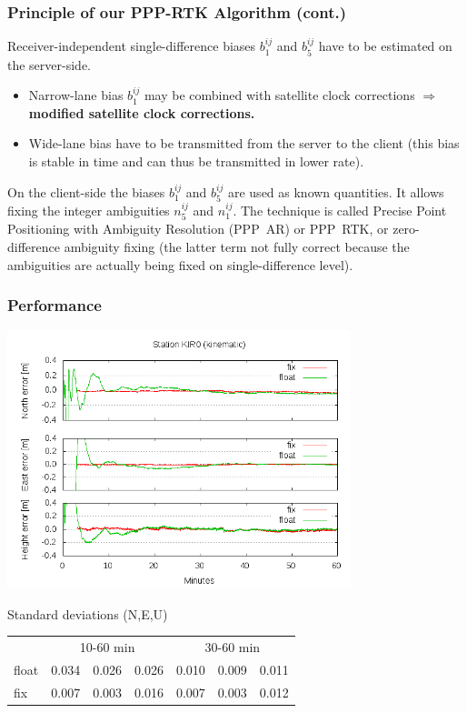 \documentclass[10pt]{beamer}
\begin{document}
\begin{frame}
  \frametitle{Principle of our PPP-RTK Algorithm (cont.)}
  Receiver-independent single-difference biases $b_1^{ij}$ and $b_5^{ij}$ have 
  to be estimated on the server-side.
  \begin{itemize}
  \item Narrow-lane bias $b_1^{ij}$ may be combined with satellite clock
    corrections $\Longrightarrow$ \textbf{modified satellite clock corrections.}
  \item Wide-lane bias have to be transmitted from the server to the client
    (this bias is stable in time and can thus be transmitted in lower rate).
  \end{itemize}

  On the client-side the biases $b_1^{ij}$ and $b_5^{ij}$ are used as known
  quantities. It allows fixing the integer ambiguities $n_5^{ij}$ and
  $n_1^{ij}$. The technique is called Precise Point Positioning with Ambiguity
  Resolution (PPP~AR) or PPP~RTK, or zero-difference ambiguity
  fixing (the latter term not fully correct because the ambiguities are
  actually being fixed on single-difference level).
\end{frame}


\begin{frame}
  \frametitle{Performance}
  \begin{center}
    \includegraphics[width=0.75\textwidth]{kir0.png}
  \end{center}
  \vspace*{-5mm}
  \begin{block}{Standard deviations (N,E,U)}
  \vspace*{3mm}
  \begin{small}
  \hspace*{2cm}
  \begin{tabular}{l|ccc|ccc}
  \mbox{} & \multicolumn{3}{c|}{10-60 min} & \multicolumn{3}{c}{30-60 min} \\
  float & 0.034 & 0.026 & 0.026         & 0.010 & 0.009 & 0.011  \\
  fix   & 0.007 & 0.003 & 0.016         & 0.007 & 0.003 & 0.012
  \end{tabular}
  \end{small}
  \end{block}
\end{frame}
\end{document}
